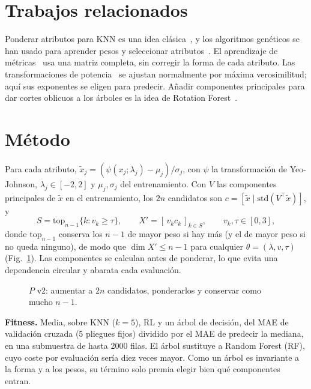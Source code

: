 \documentclass[runningheads]{llncs}
\begin{document}
\section{Trabajos relacionados}
Ponderar atributos para KNN es una idea clásica~\cite{wettschereck1997}, y los algoritmos genéticos se han usado para
aprender pesos y seleccionar atributos~\cite{raymer2000}. El aprendizaje de métricas~\cite{weinberger2009} usa una
matriz completa, sin corregir la forma de cada atributo. Las transformaciones de potencia~\cite{yeo2000} se ajustan
normalmente por máxima verosimilitud; aquí sus exponentes se eligen para predecir. Añadir componentes principales para
dar cortes oblicuos a los árboles es la idea de Rotation Forest~\cite{rodriguez2006}.

\section{Método}
Para cada atributo, $\tilde x_j=(\psi(x_j;\lambda_j)-\mu_j)/\sigma_j$, con $\psi$ la transformación de Yeo-Johnson,
$\lambda_j\in[-2,2]$ y $\mu_j,\sigma_j$ del entrenamiento. Con $V$ las componentes principales de $\tilde x$ en el
entrenamiento, los $2n$ candidatos son $c=[\tilde x\mid \mathrm{std}(V^\top\tilde x)]$, y
\begin{equation}
S=\mathrm{top}_{n-1}\{k: v_k\ge\tau\},\qquad X'=[\,v_k c_k\,]_{k\in S},\qquad v_k,\tau\in[0,3],
\end{equation}
donde $\mathrm{top}_{n-1}$ conserva los $n-1$ de mayor peso si hay más (y el de mayor peso si no queda ninguno), de modo
que $\dim X'\le n-1$ para cualquier $\theta=(\lambda,v,\tau)$ (Fig.~\ref{fig:esquema}). Las componentes se calculan
antes de ponderar, lo que evita una dependencia circular y abarata cada evaluación.

\begin{figure}[t]\centering{}

\caption{$P$ v2: aumentar a $2n$ candidatos, ponderarlos y conservar como mucho $n-1$.}
\label{fig:esquema}
\end{figure}

\textbf{Fitness.} Media, sobre KNN ($k=5$), RL y un árbol de decisión, del MAE de validación cruzada (5 pliegues
fijos) dividido por el MAE de predecir la mediana, en una submuestra de hasta 2000 filas. El árbol sustituye a Random
Forest (RF), cuyo coste por evaluación sería diez veces mayor. Como un árbol es invariante a la forma y a los pesos,
su término solo premia elegir bien qué componentes entran.
\end{document}
